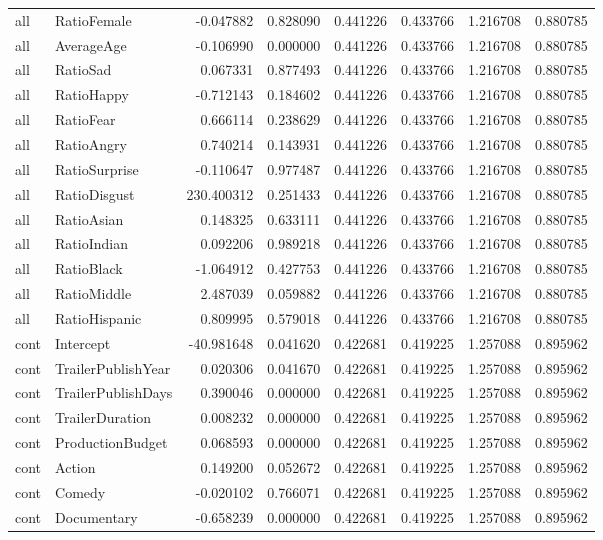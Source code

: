 \begin{tabular}{llrrrrrr}
all & RatioFemale & -0.047882 & 0.828090 & 0.441226 & 0.433766 & 1.216708 & 0.880785 \\
all & AverageAge & -0.106990 & 0.000000 & 0.441226 & 0.433766 & 1.216708 & 0.880785 \\
all & RatioSad & 0.067331 & 0.877493 & 0.441226 & 0.433766 & 1.216708 & 0.880785 \\
all & RatioHappy & -0.712143 & 0.184602 & 0.441226 & 0.433766 & 1.216708 & 0.880785 \\
all & RatioFear & 0.666114 & 0.238629 & 0.441226 & 0.433766 & 1.216708 & 0.880785 \\
all & RatioAngry & 0.740214 & 0.143931 & 0.441226 & 0.433766 & 1.216708 & 0.880785 \\
all & RatioSurprise & -0.110647 & 0.977487 & 0.441226 & 0.433766 & 1.216708 & 0.880785 \\
all & RatioDisgust & 230.400312 & 0.251433 & 0.441226 & 0.433766 & 1.216708 & 0.880785 \\
all & RatioAsian & 0.148325 & 0.633111 & 0.441226 & 0.433766 & 1.216708 & 0.880785 \\
all & RatioIndian & 0.092206 & 0.989218 & 0.441226 & 0.433766 & 1.216708 & 0.880785 \\
all & RatioBlack & -1.064912 & 0.427753 & 0.441226 & 0.433766 & 1.216708 & 0.880785 \\
all & RatioMiddle & 2.487039 & 0.059882 & 0.441226 & 0.433766 & 1.216708 & 0.880785 \\
all & RatioHispanic & 0.809995 & 0.579018 & 0.441226 & 0.433766 & 1.216708 & 0.880785 \\
cont & Intercept & -40.981648 & 0.041620 & 0.422681 & 0.419225 & 1.257088 & 0.895962 \\
cont & TrailerPublishYear & 0.020306 & 0.041670 & 0.422681 & 0.419225 & 1.257088 & 0.895962 \\
cont & TrailerPublishDays & 0.390046 & 0.000000 & 0.422681 & 0.419225 & 1.257088 & 0.895962 \\
cont & TrailerDuration & 0.008232 & 0.000000 & 0.422681 & 0.419225 & 1.257088 & 0.895962 \\
cont & ProductionBudget & 0.068593 & 0.000000 & 0.422681 & 0.419225 & 1.257088 & 0.895962 \\
cont & Action & 0.149200 & 0.052672 & 0.422681 & 0.419225 & 1.257088 & 0.895962 \\
cont & Comedy & -0.020102 & 0.766071 & 0.422681 & 0.419225 & 1.257088 & 0.895962 \\
cont & Documentary & -0.658239 & 0.000000 & 0.422681 & 0.419225 & 1.257088 & 0.895962 \\

\end{tabular}

